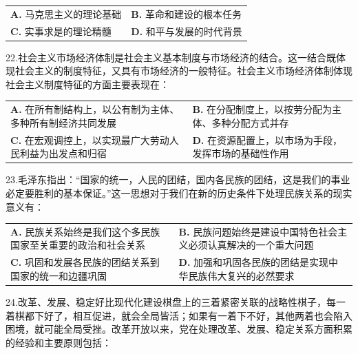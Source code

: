 \documentclass[UTF8,11pt]{ctexart}
\begin{document}
\begin{center}\begin{tabular}{>{\raggedright\arraybackslash}p{\dimexpr(\linewidth-4\tabcolsep)/2\relax}>{\raggedright\arraybackslash}p{\dimexpr(\linewidth-4\tabcolsep)/2\relax}}
\textbf{A.} 马克思主义的理论基础 & \textbf{B.} 革命和建设的根本任务\\[.35em]
\textbf{C.} 实事求是的理论精髓 & \textbf{D.} 和平与发展的时代背景\\[.35em]\end{tabular}\end{center}

22.社会主义市场经济体制是社会主义基本制度与市场经济的结合。这一结合既体现社会主义的制度特征，又具有市场经济的一般特征。社会主义市场经济体制体现社会主义制度特征的方面主要表现在：


\begin{center}\begin{tabular}{>{\raggedright\arraybackslash}p{\dimexpr(\linewidth-4\tabcolsep)/2\relax}>{\raggedright\arraybackslash}p{\dimexpr(\linewidth-4\tabcolsep)/2\relax}}
\textbf{A.} 在所有制结构上，以公有制为主体、多种所有制经济共同发展 & \textbf{B.} 在分配制度上，以按劳分配为主体、多种分配方式并存\\[.35em]
\textbf{C.} 在宏观调控上，以实现最广大劳动人民利益为出发点和归宿 & \textbf{D.} 在资源配置上，以市场为手段，发挥市场的基础性作用\\[.35em]\end{tabular}\end{center}

23.毛泽东指出：“国家的统一，人民的团结，国内各民族的团结，这是我们的事业必定要胜利的基本保证。”这一思想对于我们在新的历史条件下处理民族关系的现实意义有：


\begin{center}\begin{tabular}{>{\raggedright\arraybackslash}p{\dimexpr(\linewidth-4\tabcolsep)/2\relax}>{\raggedright\arraybackslash}p{\dimexpr(\linewidth-4\tabcolsep)/2\relax}}
\textbf{A.} 民族关系始终是我们这个多民族国家至关重要的政治和社会关系 & \textbf{B.} 民族问题始终是建设中国特色社会主义必须认真解决的一个重大问题\\[.35em]
\textbf{C.} 巩固和发展各民族的团结关系到国家的统一和边疆巩固 & \textbf{D.} 加强和巩固各民族的团结是实现中华民族伟大复兴的必然要求\\[.35em]\end{tabular}\end{center}

24.改革、发展、稳定好比现代化建设棋盘上的三着紧密关联的战略性棋子，每一着棋都下好了，相互促进，就会全局皆活；如果有一着下不好，其他两着也会陷入困境，就可能全局受挫。改革开放以来，党在处理改革、发展、稳定关系方面积累的经验和主要原则包括：
\end{document}
